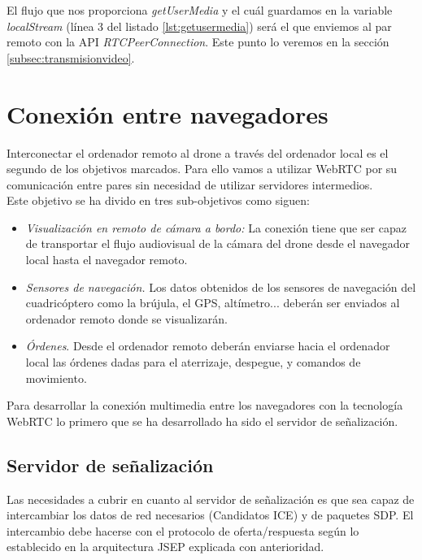 El flujo que nos proporciona \emph{getUserMedia} y el cuál guardamos en la variable \emph{localStream} (línea 3 del listado \ref{lst:getusermedia}) será el que enviemos al par remoto con la API \emph{RTCPeerConnection}. Este punto lo veremos en la sección \ref{subsec:transmisionvideo}.\\

\section{Conexión entre navegadores}

Interconectar el ordenador remoto al drone a través del ordenador local es el segundo de los objetivos marcados. Para ello vamos a utilizar WebRTC por su comunicación entre pares sin necesidad de utilizar servidores intermedios.\\

Este objetivo se ha divido en tres sub-objetivos como siguen:
\begin{itemize}

\item \emph{Visualización en remoto de cámara a bordo:} La conexión tiene que ser capaz de transportar el flujo audiovisual de la cámara del drone desde el navegador local hasta el navegador remoto.

\item \emph{Sensores de navegación.} Los datos obtenidos de los sensores de navegación del cuadricóptero como la brújula, el GPS, altímetro... deberán ser enviados al ordenador remoto donde se visualizarán.

\item \emph{Órdenes}. Desde el ordenador remoto deberán enviarse hacia el ordenador local las órdenes dadas para el aterrizaje, despegue, y comandos de movimiento.

\end{itemize}

Para desarrollar la conexión multimedia entre los navegadores con la tecnología WebRTC lo primero que se ha desarrollado ha sido el servidor de señalización.\\

\subsection{Servidor de señalización}

Las necesidades a cubrir en cuanto al servidor de señalización es que sea capaz de intercambiar los datos de red necesarios (Candidatos ICE) y de paquetes SDP. El intercambio debe hacerse con el protocolo de oferta/respuesta según lo establecido en la arquitectura JSEP explicada con anterioridad.\\

